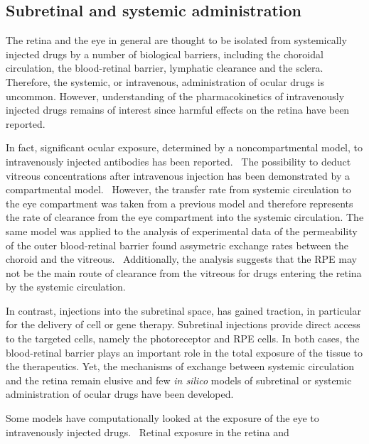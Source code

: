 \documentclass[12pt,a4paper]{journal}
\begin{document}
\subsection*{Subretinal and systemic administration}

The retina and the eye in general are thought to be isolated from systemically injected drugs by a number of biological barriers, including the choroidal circulation, the blood-retinal barrier, lymphatic clearance and the sclera.
Therefore, the systemic, or intravenous, administration of ocular drugs is uncommon.
However, understanding of the pharmacokinetics of intravenously injected drugs remains of interest since harmful effects on the retina have been reported.~\cite{Fu_2017}

In fact, significant ocular exposure, determined by a noncompartmental model, to intravenously injected antibodies has been reported.~\cite{Shivva_2021}
The possibility to deduct vitreous concentrations after intravenous injection has been demonstrated by a compartmental model.~\cite{Vellonen_2015}
However, the transfer rate from systemic circulation to the eye compartment was taken from a previous model and therefore represents the rate of clearance from the eye compartment into the systemic circulation.
The same model was applied to the analysis of experimental data of the permeability of the outer blood-retinal barrier found assymetric exchange rates between the choroid and the vitreous.~\cite{Ramsay_2019}
Additionally, the analysis suggests that the RPE may not be the main route of clearance from the vitreous for drugs entering the retina by the systemic circulation.~\cite{Ramsay_2019}


In contrast, injections into the subretinal space, has gained traction, in particular for the delivery of cell or gene therapy.
Subretinal injections provide direct access to the targeted cells, namely the photoreceptor and RPE cells.
In both cases, the blood-retinal barrier plays an important role in the total exposure of the tissue to the therapeutics.
Yet, the mechanisms of exchange between systemic circulation and the retina remain elusive and few \textit{in silico} models of subretinal or systemic administration of ocular drugs have been developed.


Some models have computationally looked at the exposure of the eye to intravenously injected drugs.~\cite{Shivva_2021,Vellonen_2015}
Retinal exposure in the retina and 




\end{document}
